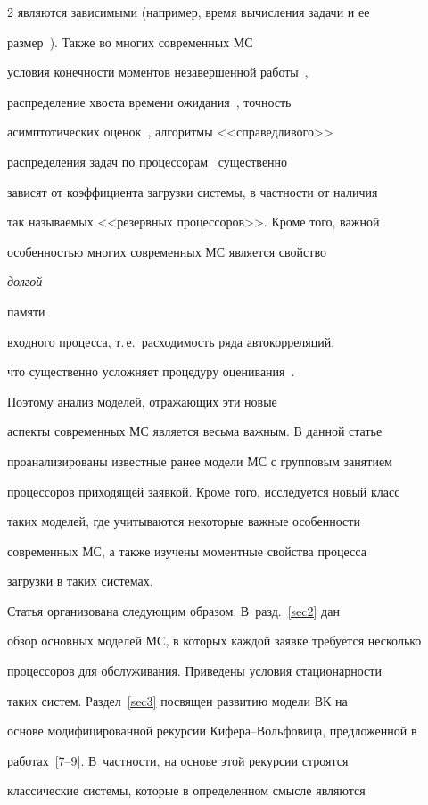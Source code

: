 \begin{multicols}{2}
являются зависимыми (например, время вычисления задачи и ее

размер~\cite{feit-coplot,krampe10}). Также  во многих современных МС

условия конечности моментов незавершенной работы~\cite{scheller11},

распределение хвоста времени ожидания~\cite{foss06}, точность

асимптотических оценок~\cite{gupta10}, алгоритмы <<справедливого>>

распределения задач по процессорам~\cite{harchol01} существенно

зависят от коэффициента загрузки системы, в частности от наличия

так называемых <<резервных процессоров>>. Кроме того, важной

особенностью многих современных МС является свойство {\it долгой

памяти} входного процесса, т.\,е.\  расходимость ряда автокорреляций,

что существенно усложняет процедуру оценивания~\cite{feit-coplot, krampe10}. 

Поэтому анализ моделей, отражающих эти новые

аспекты современных  МС является весьма важным. В данной статье

проанализированы известные ранее модели МС с групповым занятием

процессоров приходящей заявкой. Кроме того, исследуется новый класс

таких моделей, где учитываются некоторые важные особенности

современных МС, а  также изучены моментные свойства процесса

загрузки в таких системах.



Статья организована следующим образом.  В~разд.~\ref{sec2} дан

 обзор  основных моделей МС, в которых каждой заявке требуется несколько

процессоров для обслуживания. Приведены    условия стационар\-ности

таких систем. Раздел~\ref{sec3} посвящен развитию модели ВК на

основе модифицированной рекурсии Ки\-фе\-ра--Воль\-фо\-ви\-ца, предложенной в

работах~[7--9]. В~част\-ности, на основе этой рекурсии строятся

классические системы, которые в определенном смысле являются


\end{multicols}
